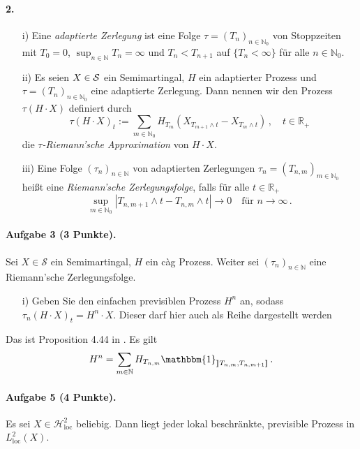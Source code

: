 \documentclass{article}
\begin{document}
\paragraph{ 2.}
\begin{itemize}
\item [i)] Eine \emph{adaptierte Zerlegung} ist eine Folge $\tau=(T_n)_{n\in\mathbb{N}_0}$ von Stoppzeiten mit $T_0=0$, $\sup_{n\in\mathbb{N}}T_n=\infty$ und $T_n<T_{n+1}$ auf $\{T_n<\infty\}$ für alle $n\in\mathbb{N}_0$.
\item [ii)] Es seien $X\in{\cal S}$ ein Semimartingal, $H$ ein adaptierter Prozess und $\tau=(T_n)_{n\in\mathbb{N}_0}$ eine adaptierte Zerlegung.
  Dann nennen wir den Prozess $\tau(H\cdot X)$ definiert durch
  \[
    \tau(H\cdot X)_t:=\sum_{m\in\mathbb{N}_0}H_{T_m}(X_{T_{m+1}\wedge t}-X_{T_m\wedge t})\,,\quad t\in\mathbb{R}_+
  \]
  die \emph{$\tau$-Riemann'sche Approximation} von $H\cdot X$.
\item [iii)] Eine Folge $(\tau_n)_{n\in\mathbb{N}}$ von adaptierten Zerlegungen $\tau_n=(T_{n,m})_{m\in\mathbb{N}_0}$ heißt eine \emph{Riemann'sche Zerlegungsfolge}, falls für alle $t\in\mathbb{R}_+$
  \[
    \sup_{m\in\mathbb{N}_0}|T_{n,m+1}\wedge t-T_{n,m}\wedge t|\to0\quad\text{für }n\to\infty\,.
  \]
\end{itemize}  

\paragraph{Aufgabe 3 \textnormal{(3 Punkte)}.}
Sei $X\in\mathscr{S}$ ein Semimartingal, $H$ ein càg Prozess.
Weiter sei $(\tau_n)_{n\in\mathbb{N}}$ eine Riemann'sche Zerlegungsfolge.
\begin{itemize}
\item [i)] Geben Sie den einfachen previsiblen Prozess $H^n$ an, sodass $\tau_n(H\cdot X)_t=H^n\cdot X$.
  Dieser darf hier auch als Reihe dargestellt werden
\end{itemize}
Das ist Proposition 4.44 in \cite{jacod2013limit}.
Es gilt
\[
  H^n=\sum_{m\in\mathbb{N}}H_{T_{n,m}}\mathbbm{1}_{\rrbracket T_{n,m},T_{n,m+1}\rrbracket}\,.
\]

\paragraph{Aufgabe 5 \textnormal{(4 Punkte)}.}
Es sei $X\in\mathscr{H}_{\text{loc}}^2$ beliebig.
Dann liegt jeder lokal beschränkte, previsible Prozess in $L_{\text{loc}}^2(X)$.
\end{document}
